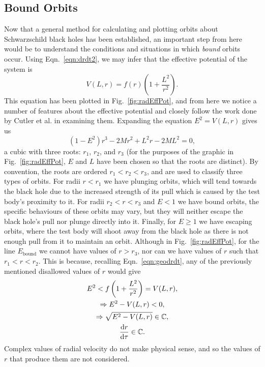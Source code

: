 
\subsection{Bound Orbits}
Now that a general method for calculating and plotting orbits about Schwarzschild black holes has been established, an important step from here would be to understand the conditions and situations in which \textit{bound} orbits occur.
Using Eqn.~\eqref{eqn:drdt2}, we may infer that the effective potential of the system is
\begin{equation}\label{eqn:effPot}
    V(L,r)=f(r)\left(1+\frac{L^2}{r^2}\right).
\end{equation}
This equation has been plotted in Fig.~\eqref{fig:radEffPot}, and from here we notice a number of features about the effective potential and closely follow the work done by Cutler et al. \cite{cutlerEtAl} in examining them.
Expanding the equation $E^2=V(L,r)$ gives us
\begin{equation}\label{eqn:cubicEffPot}
    (1-E^2)r^3-2Mr^2+L^2r-2ML^2=0,
\end{equation}
a cubic with three roots: $r_1$, $r_2$, and $r_3$ (for the purposes of the graphic in Fig.~\eqref{fig:radEffPot}, $E$ and $L$ have been chosen so that the roots are distinct).
By convention, the roots are ordered $r_1<r_2<r_3$, and are used to classify three types of orbits.
For radii $r<r_1$ we have plunging orbits, which will tend towards the black hole due to the increased strength of its pull which is caused by the test body's proximity to it.
For radii $r_2<r<r_3$ and $E<1$ we have bound orbits, the specific behaviours of these orbits may vary, but they will neither escape the black hole's pull nor plunge directly into it.
Finally, for $E\geq 1$ we have escaping orbits, where the test body will shoot away from  the black hole as there is not enough pull from it to maintain an orbit.
Although in Fig.~\eqref{fig:radEffPot}, for the line $E_\text{bound}$ we cannot have values of $r>r_3$, nor can we have values of $r$ such that $r_1<r<r_2$.
This is because, recalling Eqn.~\eqref{eqn:geodrdt}, any of the previously mentioned disallowed values of $r$ would give
\begin{gather}
    E^2<f\left(1+\frac{L^2}{r^2}\right)=V(L,r),\\
    \Rightarrow E^2-V(L,r)<0,\\
    \Rightarrow \sqrt{E^2-V(L,r)} \in \mathbb{C},\\
    \dv{r}{\tau}\in\mathbb{C}.
\end{gather}
Complex values of radial velocity do not make physical sense, and so the values of $r$ that produce them are not considered.

